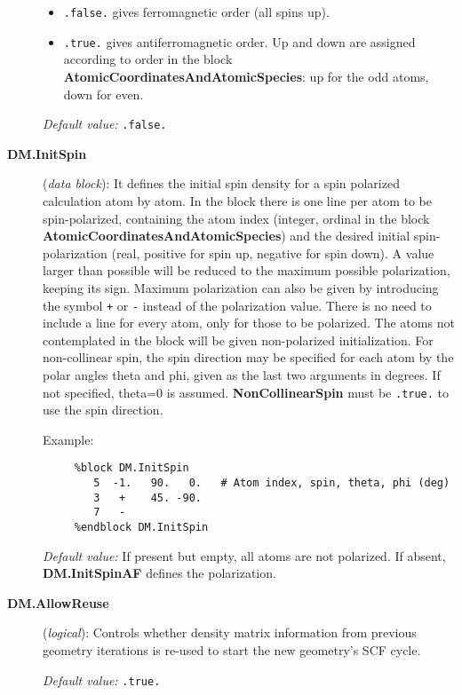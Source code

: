 \begin{description}
\begin{itemize}
\item \texttt{.false.} gives ferromagnetic order (all spins up).
\item \texttt{.true.} gives antiferromagnetic order. Up and down are
assigned according to order in the block
\textbf{AtomicCoordinatesAndAtomicSpecies}: up for the odd atoms, down for even.
\end{itemize}

\textit{Default value:} \texttt{.false.}


\item[\textbf{DM.InitSpin}] (\textit{data block}):
 It defines the
initial spin density for a spin polarized calculation atom by atom.
In the block there is one line per atom to be spin-polarized,
containing the atom index (integer, ordinal in the block
\textbf{AtomicCoordinatesAndAtomicSpecies}) and the desired
initial spin-polarization (real, positive for spin up, negative for
spin down). A value larger than possible will be reduced
to the maximum possible polarization, keeping its sign.
Maximum polarization can also be given by introducing the
symbol \texttt{+} or \texttt{-} instead of the polarization value.
There is no need to include a line for every atom, only for
those to be polarized. The atoms not contemplated in the block will
be given non-polarized initialization.
For non-collinear spin, the spin direction may be specified for
each atom by the polar angles theta and phi, given as the last
two arguments in degrees. If not specified, theta=0 is assumed.
\textbf{NonCollinearSpin} must be \texttt{.true.} to use the spin direction.

Example:

\begin{verbatim}
     %block DM.InitSpin
        5  -1.   90.   0.   # Atom index, spin, theta, phi (deg)
        3   +    45. -90.
        7   -
     %endblock DM.InitSpin
\end{verbatim}

\textit{Default value:} If present but empty, all atoms are not polarized.
If absent, \textbf{DM.InitSpinAF} defines the polarization.

\item[\textbf{DM.AllowReuse}] (\textit{logical}):
Controls whether density matrix information from previous geometry
iterations is re-used to start the new geometry's SCF cycle.

\textit{Default value:} \texttt{.true.}



\end{description}
